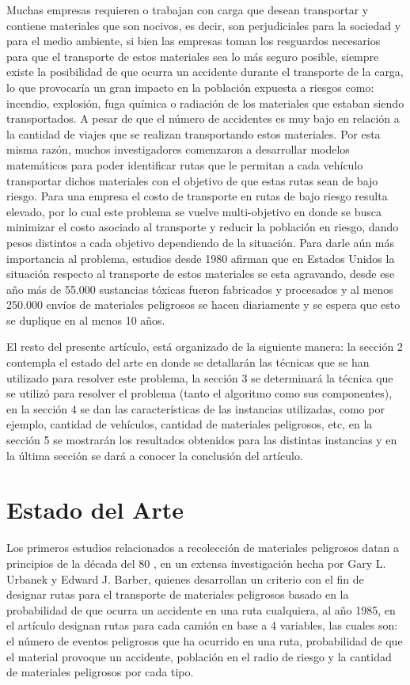\documentclass[conference]{IEEEtran}
\begin{document}
Muchas empresas requieren o trabajan con carga que desean transportar y contiene materiales que son nocivos, es decir, son perjudiciales para la sociedad y para el medio ambiente, si bien las empresas toman los resguardos necesarios para que el transporte de estos materiales sea lo m\'as seguro posible, siempre existe la posibilidad \cite{b1} de que ocurra un accidente durante el transporte de la carga, lo que provocar\'ia un gran impacto en la poblaci\'on expuesta a riesgos \cite{b2} como: incendio, explosi\'on, fuga qu\'imica o radiaci\'on  de los materiales que estaban siendo transportados. A pesar de que el n\'umero de accidentes es muy bajo en relaci\'on a la cantidad de viajes que se realizan transportando estos materiales. Por esta misma raz\'on, muchos investigadores comenzaron a desarrollar modelos matem\'aticos para poder identificar rutas que le permitan a cada veh\'iculo transportar dichos materiales con el objetivo de que estas rutas sean de bajo riesgo. Para una empresa el costo de transporte en rutas de bajo riesgo resulta elevado, por lo cual este problema se vuelve multi-objetivo en donde se busca minimizar el costo asociado al transporte y reducir la poblaci\'on en riesgo, dando pesos distintos a cada objetivo dependiendo de la situaci\'on. Para darle a\'un m\'as importancia al problema, estudios desde 1980 afirman \cite{b3} que en Estados Unidos la situaci\'on respecto al transporte de estos materiales se esta agravando, desde ese a\~no m\'as de 55.000 sustancias t\'oxicas fueron fabricados y procesados y al menos 250.000 env\'ios de materiales peligrosos se hacen diariamente y se espera que esto se duplique en al menos 10 a\~nos.

El resto del presente art\'iculo, est\'a organizado de la siguiente manera: la secci\'on 2 contempla el estado del arte en donde se detallar\'an las t\'ecnicas que se han utilizado para resolver este problema, la secci\'on 3 se determinar\'a la t\'ecnica que se utiliz\'o para resolver el problema (tanto el algoritmo como sus componentes), en la secci\'on 4 se dan las caracter\'isticas de las instancias utilizadas, como por ejemplo, cantidad de veh\'iculos, cantidad de materiales peligrosos, etc, en la secci\'on 5 se mostrar\'an los resultados obtenidos para las distintas instancias y en la \'ultima secci\'on se dar\'a a conocer la conclusi\'on del art\'iculo.

\section{Estado del Arte}
Los primeros estudios relacionados a recolecci\'on de materiales peligrosos datan a principios de la d\'ecada del 80 \cite{b4}, en un extensa investigaci\'on hecha por Gary L. Urbanek y Edward J. Barber, quienes desarrollan un criterio con el fin de designar rutas para el transporte de materiales peligrosos basado en la probabilidad de que ocurra un accidente en una ruta cualquiera, al a\~no 1985, en el art\'iculo \cite{b3} designan rutas para cada cami\'on en base a 4 variables, las cuales son: el n\'umero de eventos peligrosos que ha ocurrido en una ruta, probabilidad de que el material provoque un accidente, poblaci\'on en el radio de riesgo y la cantidad de materiales peligrosos por cada tipo. 
\end{document}
